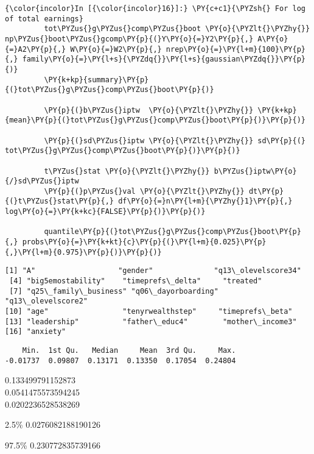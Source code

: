    \begin{Verbatim}[commandchars=\\\{\}]
{\color{incolor}In [{\color{incolor}16}]:} \PY{c+c1}{\PYZsh{} For log of total earnings}
         tot\PYZus{}g\PYZus{}comp\PYZus{}boot \PY{o}{\PYZlt{}\PYZhy{}} np\PYZus{}boot\PYZus{}gcomp\PY{p}{(}Y\PY{o}{=}Y2\PY{p}{,} A\PY{o}{=}A2\PY{p}{,} W\PY{o}{=}W2\PY{p}{,} nrep\PY{o}{=}\PY{l+m}{100}\PY{p}{,} family\PY{o}{=}\PY{l+s}{\PYZdq{}}\PY{l+s}{gaussian\PYZdq{}}\PY{p}{)} 
         \PY{k+kp}{summary}\PY{p}{(}tot\PYZus{}g\PYZus{}comp\PYZus{}boot\PY{p}{)}
         
         \PY{p}{(}b\PYZus{}iptw  \PY{o}{\PYZlt{}\PYZhy{}} \PY{k+kp}{mean}\PY{p}{(}tot\PYZus{}g\PYZus{}comp\PYZus{}boot\PY{p}{)}\PY{p}{)}
         
         \PY{p}{(}sd\PYZus{}iptw \PY{o}{\PYZlt{}\PYZhy{}} sd\PY{p}{(}  tot\PYZus{}g\PYZus{}comp\PYZus{}boot\PY{p}{)}\PY{p}{)}
         
         t\PYZus{}stat \PY{o}{\PYZlt{}\PYZhy{}} b\PYZus{}iptw\PY{o}{/}sd\PYZus{}iptw
         \PY{p}{(}p\PYZus{}val \PY{o}{\PYZlt{}\PYZhy{}} dt\PY{p}{(}t\PYZus{}stat\PY{p}{,} df\PY{o}{=}n\PY{l+m}{\PYZhy{}1}\PY{p}{,} log\PY{o}{=}\PY{k+kc}{FALSE}\PY{p}{)}\PY{p}{)}
         
         quantile\PY{p}{(}tot\PYZus{}g\PYZus{}comp\PYZus{}boot\PY{p}{,} probs\PY{o}{=}\PY{k+kt}{c}\PY{p}{(}\PY{l+m}{0.025}\PY{p}{,}\PY{l+m}{0.975}\PY{p}{)}\PY{p}{)}
\end{Verbatim}


    \begin{Verbatim}[commandchars=\\\{\}]
 [1] "A"                   "gender"              "q13\_olevelscore34"  
 [4] "big5emostability"    "timeprefs\_delta"     "treated"            
 [7] "q25\_family\_business" "q06\_dayorboarding"   "q13\_olevelscore2"   
[10] "age"                 "tenyrwealthstep"     "timeprefs\_beta"     
[13] "leadership"          "father\_educ4"        "mother\_income3"     
[16] "anxiety"            

    \end{Verbatim}

    
    \begin{verbatim}
    Min.  1st Qu.   Median     Mean  3rd Qu.     Max. 
-0.01737  0.09807  0.13171  0.13350  0.17054  0.24804 
    \end{verbatim}

    
    0.133499791152873\\

    
    0.0541475573594245\\

    
    0.0202236528538269\\

    
    \begin{description*}
\item[2.5\%] 0.0276082188190126\\
\item[97.5\%] 0.230772835739166
\end{description*}


